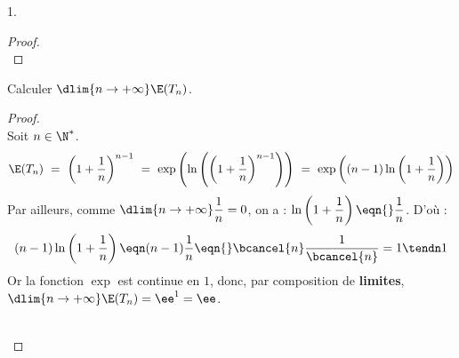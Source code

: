 \documentclass[11pt]{article}%
\begin{document}
\begin{noliste}{1.}
\begin{proof}
    
    
    
    ~\\[-1.4cm]
  \end{proof}
  
\item Calculer $\dlim{n\to+\infty} \E(T_n)$.
  
  \begin{proof}~\\
    Soit $n\in\N^*$.
    \[
    \E(T_n) \ = \ \left(1+\dfrac{1}{n}\right)^{n-1}
    \ = \ \exp \left(\ln\left(\left(1+\dfrac{1}{n}\right)^{n-1} 
      \right)\right)
    \ = \ \exp\left( (n-1) \ln\left( 1+\dfrac{1}{n}\right)\right)
    \]
    Par ailleurs, comme $\dlim{n\to+\infty}\dfrac{1}{n} = 0$, on a :
    $\ln\left(1+\dfrac{1}{n}\right) \eqn{} \dfrac{1}{n}$.
    D'où :
    \[
    (n-1)\ln\left(1+\dfrac{1}{n}\right) \eqn (n-1)\dfrac{1}{n} \eqn{}
    \bcancel{n}\dfrac{1}{\bcancel{n}} = 1 \tendn 1
    \]
    Or la fonction $\exp$ est continue en $1$, donc, par composition
    de {\bf limites}, $\dlim{n\to+\infty} \E(T_n) = \ee^1 = \ee$.%
    
    


    ~\\[-1.4cm]
  \end{proof}
\end{noliste}

\end{document}

